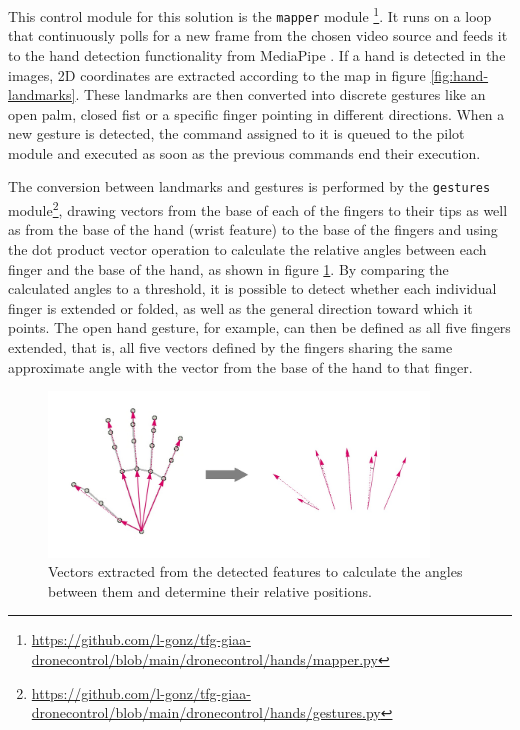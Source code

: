 This control module for this solution is the \texttt{mapper} module \footnote{\url{https://github.com/l-gonz/tfg-giaa-dronecontrol/blob/main/dronecontrol/hands/mapper.py}}.
It runs on a loop that continuously polls for a new frame from the chosen video source and feeds it to the hand detection functionality from MediaPipe \cite{mp-hands-paper}.
If a hand is detected in the images, 2D coordinates are extracted according to the map in figure \ref{fig:hand-landmarks}.
These landmarks are then converted into discrete gestures like an open palm, closed fist or a specific finger pointing in different directions.
When a new gesture is detected, the command assigned to it is queued to the pilot module and executed as soon as the previous commands end their execution.

The conversion between landmarks and gestures is performed by the \texttt{gestures} module\footnote{\url{https://github.com/l-gonz/tfg-giaa-dronecontrol/blob/main/dronecontrol/hands/gestures.py}}, drawing vectors from the base of each of the fingers to their tips as well as from the base of the hand (wrist feature) to the base of the fingers and using the dot product vector operation to calculate the relative angles between each finger and the base of the hand, as shown in figure \ref{fig:vector-calcs}.
By comparing the calculated angles to a threshold, it is possible to detect whether each individual finger is extended or folded, as well as the general direction toward which it points.
The open hand gesture, for example, can then be defined as all five fingers extended, that is, all five vectors defined by the fingers sharing the same approximate angle with the vector from the base of the hand to that finger.

\begin{figure}
  \centering
  \includegraphics[width=0.9\textwidth, keepaspectratio]{img/hand-vectors.jpg}
  \caption{Vectors extracted from the detected features to calculate the angles between them and determine their relative positions.}
  \label{fig:vector-calcs}
\end{figure}

